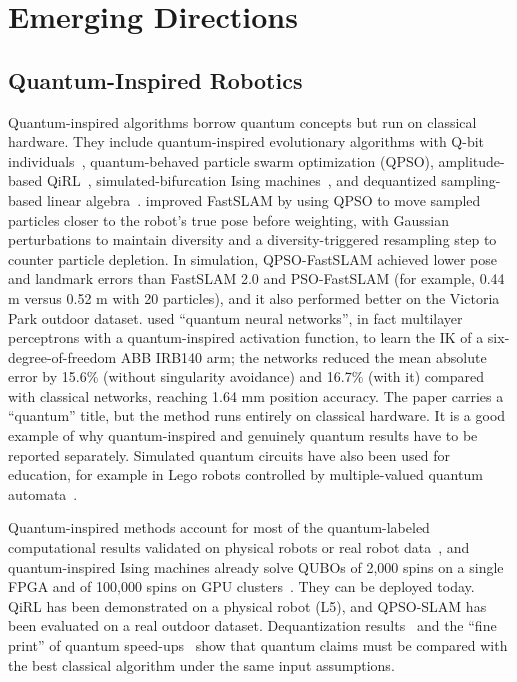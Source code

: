 \documentclass[acmsmall,screen,review]{acmart}
\begin{document}
\clearpage
\section*{Emerging Directions}

\subsection*{Quantum-Inspired Robotics}
Quantum-inspired algorithms borrow quantum concepts but run on classical hardware. They include quantum-inspired evolutionary algorithms with Q-bit individuals~\cite{Han2002}, quantum-behaved particle swarm optimization (QPSO), amplitude-based QiRL~\cite{Dong2012}, simulated-bifurcation Ising machines~\cite{Goto2019}, and dequantized sampling-based linear algebra~\cite{Tang2019,Chia2020}. \citet{Zuo2018} improved FastSLAM by using QPSO to move sampled particles closer to the robot's true pose before weighting, with Gaussian perturbations to maintain diversity and a diversity-triggered resampling step to counter particle depletion. In simulation, QPSO-FastSLAM achieved lower pose and landmark errors than FastSLAM 2.0 and PSO-FastSLAM (for example, 0.44 m versus 0.52 m with 20 particles), and it also performed better on the Victoria Park outdoor dataset. \citet{Fazilat2025b} used ``quantum neural networks'', in fact multilayer perceptrons with a quantum-inspired activation function, to learn the IK of a six-degree-of-freedom ABB IRB140 arm; the networks reduced the mean absolute error by 15.6\% (without singularity avoidance) and 16.7\% (with it) compared with classical networks, reaching 1.64 mm position accuracy. The paper carries a ``quantum'' title, but the method runs entirely on classical hardware. It is a good example of why quantum-inspired and genuinely quantum results have to be reported separately. Simulated quantum circuits have also been used for education, for example in Lego robots controlled by multiple-valued quantum automata~\cite{Raghuvanshi2007}.

Quantum-inspired methods account for most of the quantum-labeled computational results validated on physical robots or real robot data~\cite{Dong2012,Zuo2018,Fazilat2025b}, and quantum-inspired Ising machines already solve QUBOs of 2,000 spins on a single FPGA and of 100,000 spins on GPU clusters~\cite{Goto2019}. They can be deployed today. QiRL has been demonstrated on a physical robot (L5), and QPSO-SLAM has been evaluated on a real outdoor dataset. Dequantization results~\cite{Tang2019,Chia2020} and the ``fine print'' of quantum speed-ups~\cite{Aaronson2015} show that quantum claims must be compared with the best classical algorithm under the same input assumptions.
\end{document}
